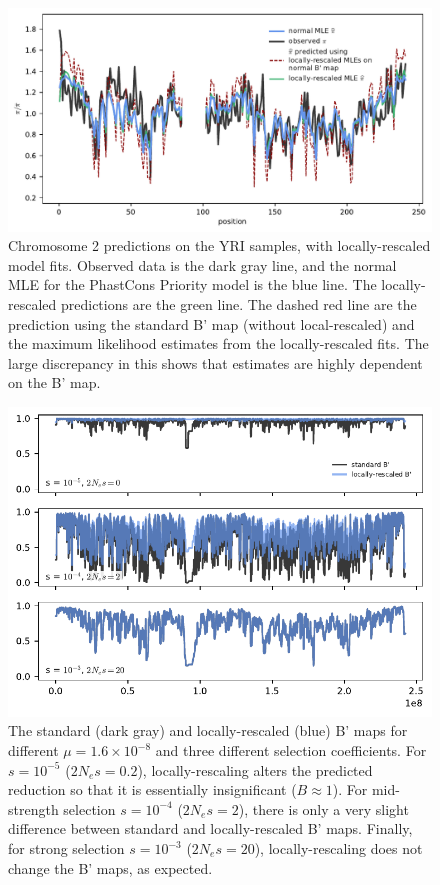 \documentclass[11pt]{article}
\begin{document}
\begin{figure}[htbp]
  \centering
  \includegraphics[]{figures/supplementary/rescale_pi_pred_plot.pdf}

  \caption{Chromosome 2 predictions on the YRI samples, with locally-rescaled
      model fits. Observed data is the dark gray line, and the normal MLE for
      the PhastCons Priority model is the blue line. The locally-rescaled
      predictions are the green line. The dashed red line are the prediction
      using the standard B' map (without local-rescaled) and the maximum likelihood
      estimates from the locally-rescaled fits. The large discrepancy in this shows
      that estimates are highly dependent on the B' map.}
    \label{suppfig:rescale}
\end{figure}

\begin{figure}[htbp]
  \centering
  \includegraphics[]{figures/supplementary/rescale_Bs.pdf}

  \caption{The standard (dark gray) and locally-rescaled (blue) B' maps for different
      $\mu = 1.6 \times 10^{-8}$ and three different selection coefficients.
      For $s=10^{-5}$ ($2N_e s = 0.2$), locally-rescaling alters the predicted
      reduction so that it is essentially insignificant ($B \approx 1$). For
  mid-strength selection $s=10^{-4}$ ($2N_e s = 2$), there is only a very
slight difference between standard and locally-rescaled B' maps. Finally, for
strong selection $s=10^{-3}$ ($2N_e s = 20$), locally-rescaling does not change
the B' maps, as expected. }
    \label{suppfig:rescale-b}
\end{figure}
\end{document}

